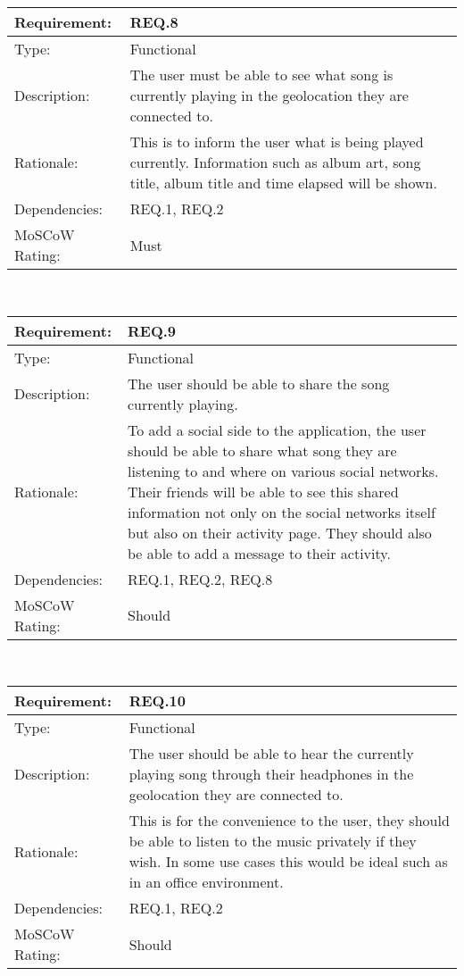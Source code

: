 \vspace{0.5cm}

\noindent
\begin{tabular}{|l || p{12.0cm}|}
  \hline
  Requirement:       & REQ.8 \\ \hline
  Type:              & Functional \\ \hline
  Description:       & The user must be able to see what song is currently playing in the geolocation they are connected to. \\ \hline
  Rationale:         & This is to inform the user what is being played currently. Information such as album art, song title, album title and time elapsed will be shown. \\ \hline
  Dependencies:      & REQ.1, REQ.2 \\ \hline
  MoSCoW Rating:     & Must \\
\hline
\end{tabular}\\

\vspace{0.5cm}

\noindent
\begin{tabular}{|l || p{12.0cm}|}
  \hline
  Requirement:       & REQ.9 \\ \hline
  Type:              & Functional \\ \hline
  Description:       & The user should be able to share the song currently playing.  \\ \hline
  Rationale:         & To add a social side to the application, the user should be able to share what song they are listening to and where on various social networks. Their friends will be able to see this shared information not only on the social networks itself but also on their activity page. They should also be able to add a message to their activity. \\ \hline
  Dependencies:      & REQ.1, REQ.2, REQ.8 \\ \hline
  MoSCoW Rating:     & Should \\ \hline
\end{tabular}\\

\vspace{0.5cm}

\noindent
\begin{tabular}{|l || p{12.0cm}|}
  \hline
  Requirement:       & REQ.10 \\ \hline
  Type:              & Functional \\ \hline
  Description:       & The user should be able to hear the currently playing song through their headphones  in the geolocation they are connected to.  \\ \hline
  Rationale:         & This is for the convenience to the user, they should be able to listen to the music privately if they wish. In some use cases this would be ideal such as in an office environment. \\ \hline
  Dependencies:      & REQ.1, REQ.2 \\ \hline
  MoSCoW Rating:     & Should \\ \hline
\end{tabular}\\

